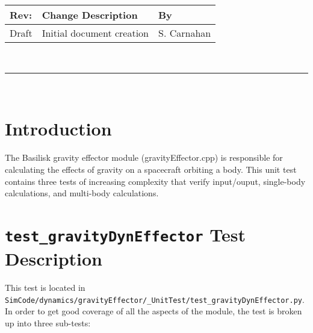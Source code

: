 \documentclass[]{BasiliskReportMemo}
\begin{document}
\makeCover


%
%
\pagestyle{empty}
{\renewcommand{\arraystretch}{1.1}
\noindent
\begin{longtable}{|p{0.5in}|p{4.5in}|p{1.14in}|}
\hline
{\bfseries Rev}: & {\bfseries Change Description} & {\bfseries By} \\
\hline
Draft & Initial document creation & S. Carnahan \\
\hline

\end{longtable}
}

\newpage
\setcounter{page}{1}
\pagestyle{fancy}



\tableofcontents
~\\ \hrule ~\\


\section{Introduction}
The Basilisk gravity effector module (gravityEffector.cpp) is responsible for calculating the effects of gravity on a spacecraft orbiting a body. This unit test contains three tests of increasing complexity that verify input/ouput, single-body calculations, and multi-body calculations.

\section{{\tt test\_gravityDynEffector} Test Description}

This test is located in {\tt SimCode/dynamics/gravityEffector/\_UnitTest/test\_gravityDynEffector.py}. In order to get good coverage of all the aspects of the module, the test is broken up into three sub-tests: \par
\end{document}
